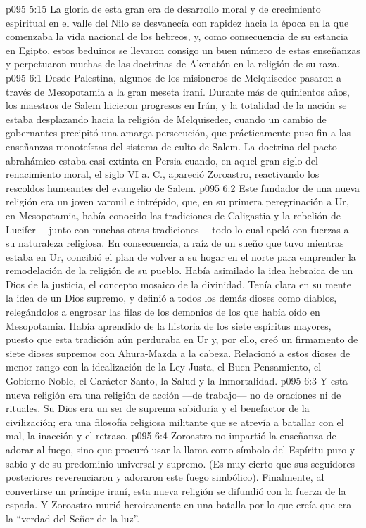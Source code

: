\vs p095 5:15 La gloria de esta gran era de desarrollo moral y de crecimiento espiritual en el valle del Nilo se desvanecía con rapidez hacia la época en la que comenzaba la vida nacional de los hebreos, y, como consecuencia de su estancia en Egipto, estos beduinos se llevaron consigo un buen número de estas enseñanzas y perpetuaron muchas de las doctrinas de Akenatón en la religión de su raza.
\vs p095 6:1 Desde Palestina, algunos de los misioneros de Melquisedec pasaron a través de Mesopotamia a la gran meseta iraní. Durante más de quinientos años, los maestros de Salem hicieron progresos en Irán, y la totalidad de la nación se estaba desplazando hacia la religión de Melquisedec, cuando un cambio de gobernantes precipitó una amarga persecución, que prácticamente puso fin a las enseñanzas monoteístas del sistema de culto de Salem. La doctrina del pacto abrahámico estaba casi extinta en Persia cuando, en aquel gran siglo del renacimiento moral, el siglo VI a. C., apareció Zoroastro, reactivando los rescoldos humeantes del evangelio de Salem.
\vs p095 6:2 Este fundador de una nueva religión era un joven varonil e intrépido, que, en su primera peregrinación a Ur, en Mesopotamia, había conocido las tradiciones de Caligastia y la rebelión de Lucifer ---junto con muchas otras tradiciones--- todo lo cual apeló con fuerzas a su naturaleza religiosa. En consecuencia, a raíz de un sueño que tuvo mientras estaba en Ur, concibió el plan de volver a su hogar en el norte para emprender la remodelación de la religión de su pueblo. Había asimilado la idea hebraica de un Dios de la justicia, el concepto mosaico de la divinidad. Tenía clara en su mente la idea de un Dios supremo, y definió a todos los demás dioses como diablos, relegándolos a engrosar las filas de los demonios de los que había oído en Mesopotamia. Había aprendido de la historia de los siete espíritus mayores, puesto que esta tradición aún perduraba en Ur y, por ello, creó un firmamento de siete dioses supremos con Ahura\hyp{}Mazda a la cabeza. Relacionó a estos dioses de menor rango con la idealización de la Ley Justa, el Buen Pensamiento, el Gobierno Noble, el Carácter Santo, la Salud y la Inmortalidad.
\vs p095 6:3 Y esta nueva religión era una religión de acción ---de trabajo--- no de oraciones ni de rituales. Su Dios era un ser de suprema sabiduría y el benefactor de la civilización; era una filosofía religiosa militante que se atrevía a batallar con el mal, la inacción y el retraso.
\vs p095 6:4 Zoroastro no impartió la enseñanza de adorar al fuego, sino que procuró usar la llama como símbolo del Espíritu puro y sabio y de su predominio universal y supremo. (Es muy cierto que sus seguidores posteriores reverenciaron y adoraron este fuego simbólico). Finalmente, al convertirse un príncipe iraní, esta nueva religión se difundió con la fuerza de la espada. Y Zoroastro murió heroicamente en una batalla por lo que creía que era la “verdad del Señor de la luz”.
